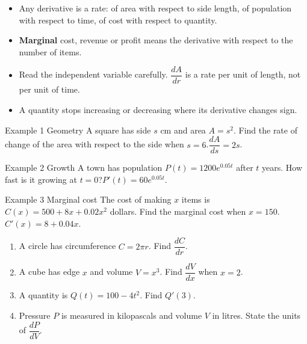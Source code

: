 \documentclass[11pt]{article}
\begin{document}

\begin{ideabox}
\begin{itemize}[leftmargin=*,itemsep=2pt,topsep=2pt]
  \item Any derivative is a rate: of area with respect to side length, of population with respect to time, of cost with respect to quantity.
  \item \textbf{Marginal} cost, revenue or profit means the derivative with respect to the number of items.
  \item Read the independent variable carefully. $\dfrac{dA}{dr}$ is a rate per unit of length, not per unit of time.
  \item A quantity stops increasing or decreasing where its derivative changes sign.
\end{itemize}
\end{ideabox}

\begin{example}{Example 1 \textperiodcentered{} Geometry}
A square has side $s$ cm and area $A=s^2$. Find the rate of change of the area with respect to the side when $s=6$.\soln $\dfrac{dA}{ds}=2s$.
\end{example}

\begin{example}{Example 2 \textperiodcentered{} Growth}
A town has population $P(t)=1200e^{0.05t}$ after $t$ years. How fast is it growing at $t=0$?\soln $P'(t)=60e^{0.05t}$.
\end{example}

\begin{example}{Example 3 \textperiodcentered{} Marginal cost}
The cost of making $x$ items is $C(x)=500+8x+0.02x^2$ dollars. Find the marginal cost when $x=150$.\soln $C'(x)=8+0.04x$.
\end{example}

\newpage
{}

\begin{enumerate}[leftmargin=*,itemsep=2pt]
  \item A circle has circumference $C=2\pi r$. Find $\dfrac{dC}{dr}$.\work{2.3cm}
  \item A cube has edge $x$ and volume $V=x^3$. Find $\dfrac{dV}{dx}$ when $x=2$.\work{2.3cm}
  \item A quantity is $Q(t)=100-4t^2$. Find $Q'(3)$.\work{2.3cm}
  \item Pressure $P$ is measured in kilopascals and volume $V$ in litres. State the units of $\dfrac{dP}{dV}$.\work{2.3cm}
\end{enumerate}
\end{document}
